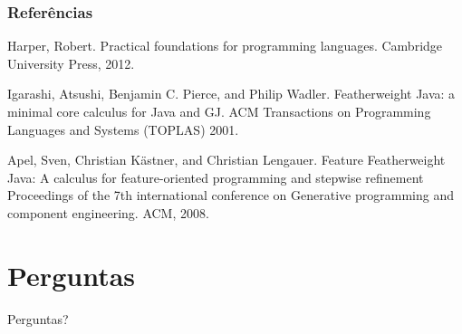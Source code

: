 \documentclass{beamer}
\begin{document}
	\begin{frame}[allowframebreaks]
		\frametitle<presentation>{Referências}
		
		\begin{thebibliography}{10}
			
			\beamertemplatearticlebibitems
			
			Harper, Robert. 
			\newblock Practical foundations for programming languages. 
			\newblock Cambridge University Press, 2012.
			
			
			\beamertemplatearticlebibitems
			Igarashi, Atsushi, Benjamin C. Pierce, and Philip Wadler.
			\newblock Featherweight Java: a minimal core calculus for Java and GJ.
			\newblock ACM Transactions on Programming Languages and Systems (TOPLAS) 2001.
			
			
			
			\beamertemplatearticlebibitems
			Apel, Sven, Christian Kästner, and Christian Lengauer.
			\newblock Feature Featherweight Java: A calculus for feature-oriented programming and stepwise refinement
			\newblock Proceedings of the 7th international conference on Generative programming and component engineering. ACM, 2008.
			
			
			
		\end{thebibliography}
		
	\end{frame}
	
	
	\section*{Perguntas}
	\begin{frame}{  }
		\Large   \centering   Perguntas?
	\end{frame}
	
\end{document}
